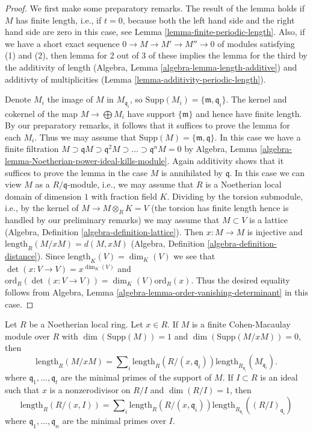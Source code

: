 \begin{proof}
We first make some preparatory remarks.
The result of the lemma holds if $M$ has finite length, i.e., if $t = 0$,
because both the left hand side and the right hand side are zero
in this case, see Lemma \ref{lemma-finite-periodic-length}.
Also, if we have a short exact sequence $0 \to M \to M' \to M'' \to 0$
of modules satisfying (1) and (2), then lemma for 2 out of 3
of these implies the lemma for the third by the
additivity of length (Algebra, Lemma \ref{algebra-lemma-length-additive}) and
additivty of multiplicities (Lemma \ref{lemma-additivity-periodic-length}).

\medskip\noindent
Denote $M_i$ the image of $M$ in $M_{\mathfrak q_i}$, so
$\text{Supp}(M_i) = \{\mathfrak m, \mathfrak q_i\}$.
The kernel and cokernel of the map $M \to \bigoplus M_i$
have support $\{\mathfrak m\}$ and hence have finite length.
By our preparatory remarks, it follows that it suffices to
prove the lemma for each $M_i$. Thus we may assume that
$\text{Supp}(M) = \{\mathfrak m, \mathfrak q\}$.
In this case we have a finite filtration
$M \supset \mathfrak qM \supset \mathfrak q^2M \supset \ldots \supset
\mathfrak q^nM = 0$ by Algebra, Lemma
\ref{algebra-lemma-Noetherian-power-ideal-kills-module}.
Again additivity shows that it suffices to prove the lemma
in the case $M$ is annihilated by $\mathfrak q$.
In this case we can view $M$ as a $R/\mathfrak q$-module,
i.e., we may assume that $R$ is a Noetherian local domain
of dimension $1$ with fraction field $K$.
Dividing by the torsion submodule, i.e., by the
kernel of $M \to M \otimes_R K = V$ (the torsion has
finite length hence is handled by our preliminary remarks)
we may assume that $M \subset V$ is a lattice
(Algebra, Definition \ref{algebra-definition-lattice}).
Then $x : M \to M$ is injective and
$\text{length}_R(M/xM) = d(M, xM)$
(Algebra, Definition \ref{algebra-definition-distance}). Since
$\text{length}_K(V) = \dim_K(V)$
we see that $\det(x : V \to V) = x^{\dim_K(V)}$ and
$\text{ord}_R(\det(x : V \to V)) = \dim_K(V) \text{ord}_R(x)$.
Thus the desired equality follows from
Algebra, Lemma \ref{algebra-lemma-order-vanishing-determinant}
in this case.
\end{proof}

\begin{lemma}
\label{lemma-additivity-divisors-restricted}
Let $R$ be a Noetherian local ring.
Let $x \in R$. If $M$ is a finite Cohen-Macaulay module over $R$
with $\dim(\text{Supp}(M)) = 1$ and $\dim(\text{Supp}(M/xM)) = 0$, then
$$
\text{length}_R(M/xM)
=
\sum\nolimits_i \text{length}_R(R/(x, \mathfrak q_i))
\text{length}_{R_{\mathfrak q_i}}(M_{\mathfrak q_i}).
$$
where $\mathfrak q_1, \ldots, \mathfrak q_t$ are the
minimal primes of the support of $M$. If $I \subset R$ is an ideal
such that $x$ is a nonzerodivisor on $R/I$ and $\dim(R/I) = 1$, then
$$
\text{length}_R(R/(x, I))
=
\sum\nolimits_i \text{length}_R(R/(x, \mathfrak q_i))
\text{length}_{R_{\mathfrak q_i}}((R/I)_{\mathfrak q_i})
$$
where $\mathfrak q_1, \ldots, \mathfrak q_n$ are the minimal
primes over $I$.
\end{lemma}

